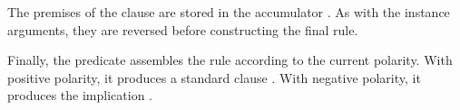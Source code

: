 The premises of the clause are stored in the accumulator . As with the
instance arguments, they are reversed before constructing the final rule.

Finally, the predicate  assembles the rule according to the
current polarity. With positive polarity, it produces a standard clause
. With negative polarity, it produces the implication
.
